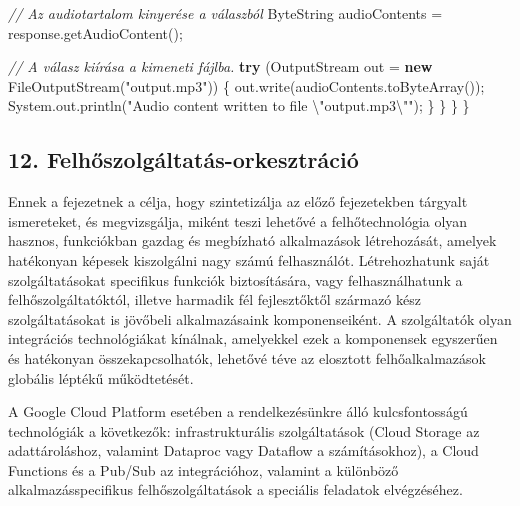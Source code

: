 \documentclass[
]{article}
\newenvironment{Shaded}{}{}
\newcommand{\BuiltInTok}[1]{\textcolor[rgb]{0.00,0.50,0.00}{#1}}
\newcommand{\CommentTok}[1]{\textcolor[rgb]{0.38,0.63,0.69}{\textit{#1}}}
\newcommand{\ControlFlowTok}[1]{\textcolor[rgb]{0.00,0.44,0.13}{\textbf{#1}}}
\newcommand{\FunctionTok}[1]{\textcolor[rgb]{0.02,0.16,0.49}{#1}}
\newcommand{\KeywordTok}[1]{\textcolor[rgb]{0.00,0.44,0.13}{\textbf{#1}}}
\newcommand{\NormalTok}[1]{#1}
\newcommand{\OperatorTok}[1]{\textcolor[rgb]{0.40,0.40,0.40}{#1}}
\newcommand{\SpecialCharTok}[1]{\textcolor[rgb]{0.25,0.44,0.63}{#1}}
\newcommand{\StringTok}[1]{\textcolor[rgb]{0.25,0.44,0.63}{#1}}
\begin{document}
\begin{Shaded}
\begin{Highlighting}[]
      \CommentTok{// Az audiotartalom kinyerése a válaszból}
\NormalTok{      ByteString audioContents }\OperatorTok{=}\NormalTok{ response}\OperatorTok{.}\FunctionTok{getAudioContent}\OperatorTok{();}

      \CommentTok{// A válasz kiírása a kimeneti fájlba.}
      \ControlFlowTok{try} \OperatorTok{(}\BuiltInTok{OutputStream}\NormalTok{ out }\OperatorTok{=} \KeywordTok{new} \BuiltInTok{FileOutputStream}\OperatorTok{(}\StringTok{"output.mp3"}\OperatorTok{))} \OperatorTok{\{}
\NormalTok{        out}\OperatorTok{.}\FunctionTok{write}\OperatorTok{(}\NormalTok{audioContents}\OperatorTok{.}\FunctionTok{toByteArray}\OperatorTok{());}
        \BuiltInTok{System}\OperatorTok{.}\FunctionTok{out}\OperatorTok{.}\FunctionTok{println}\OperatorTok{(}\StringTok{"Audio content written to file }\SpecialCharTok{\textbackslash{}"}\StringTok{output.mp3}\SpecialCharTok{\textbackslash{}"}\StringTok{"}\OperatorTok{);}
      \OperatorTok{\}}
    \OperatorTok{\}}
  \OperatorTok{\}}
\OperatorTok{\}}
\end{Highlighting}
\end{Shaded}

\hypertarget{felhux151szolguxe1ltatuxe1s-orkesztruxe1ciuxf3}{%
\subsection{12.
Felhőszolgáltatás-orkesztráció}\label{felhux151szolguxe1ltatuxe1s-orkesztruxe1ciuxf3}}

Ennek a fejezetnek a célja, hogy szintetizálja az előző fejezetekben
tárgyalt ismereteket, és megvizsgálja, miként teszi lehetővé a
felhőtechnológia olyan hasznos, funkciókban gazdag és megbízható
alkalmazások létrehozását, amelyek hatékonyan képesek kiszolgálni nagy
számú felhasználót. Létrehozhatunk saját szolgáltatásokat specifikus
funkciók biztosítására, vagy felhasználhatunk a felhőszolgáltatóktól,
illetve harmadik fél fejlesztőktől származó kész szolgáltatásokat is
jövőbeli alkalmazásaink komponenseiként. A szolgáltatók olyan
integrációs technológiákat kínálnak, amelyekkel ezek a komponensek
egyszerűen és hatékonyan összekapcsolhatók, lehetővé téve az elosztott
felhőalkalmazások globális léptékű működtetését.

A Google Cloud Platform esetében a rendelkezésünkre álló kulcsfontosságú
technológiák a következők: infrastrukturális szolgáltatások (Cloud
Storage az adattároláshoz, valamint Dataproc vagy Dataflow a
számításokhoz), a Cloud Functions és a Pub/Sub az integrációhoz,
valamint a különböző alkalmazásspecifikus felhőszolgáltatások a
speciális feladatok elvégzéséhez.
\end{document}
